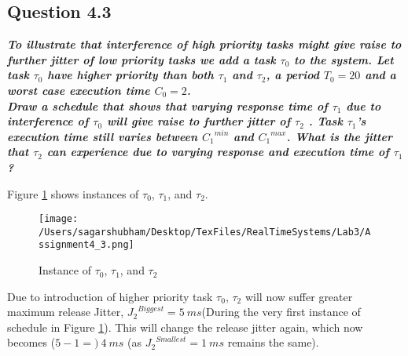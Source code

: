 \documentclass[oneside,a4paper]{article}
\begin{document}
\subsection*{\normalsize{Question 4.3}}
\textit{\textbf{To illustrate that interference of high priority tasks might give raise to further jitter of low priority tasks we add a task $\tau_0$ to the system. Let task $\tau_0$ have higher priority than both $\tau_1$ and $\tau_2$, a period $T_0 = 20$ and a worst case execution time $C_0 = 2$. \\
Draw a schedule that shows that varying response time of $\tau_1$ due to interference of $\tau_0$ will give raise to further jitter of $\tau_2$ . Task $\tau_1$’s execution time still varies between ${C_1}^{min}$ and ${C_1}^{max}$. What is the jitter that $\tau_2$ can experience due to varying response and execution time of $\tau_1$?}}\par
Figure \ref{fig4_3} shows instances of $\tau_0$, $\tau_1$, and $\tau_2$.
\begin{center}
\begin{figure}[H]
                    \centering
                    \texttt{[image: /Users/sagarshubham/Desktop/TexFiles/RealTimeSystems/Lab3/Assignment4\_3.png]}
                    \caption[Figure for Question 4.3]{Instance of $\tau_0$, $\tau_1$, and $\tau_2$}
                    \label{fig4_3}        
\end{figure}
\end{center}\par
Due to introduction of higher priority task $\tau_0$, $\tau_2$ will now suffer greater maximum release Jitter, ${J_2}^{Biggest} = 5\ ms$(During the very first instance of schedule in Figure \ref{fig4_3}). This will change the release jitter again, which now becomes ($5 - 1 =)\ 4\ ms$ (as ${J_2}^{Smallest} = 1\ ms$ remains the same).
\pagebreak
\end{document}
